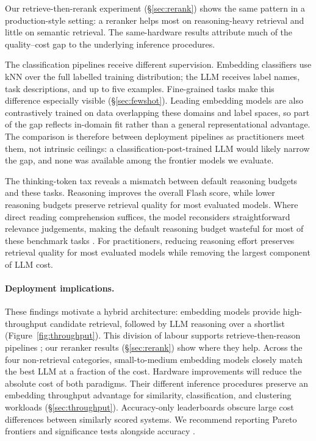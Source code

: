 Our retrieve-then-rerank experiment (\S\ref{sec:rerank}) shows the same pattern in a production-style setting: a reranker helps most on reasoning-heavy retrieval and little on semantic retrieval.
The same-hardware results attribute much of the quality--cost gap to the underlying inference procedures.

The classification pipelines receive different supervision. Embedding classifiers use kNN over the full labelled training distribution; the LLM receives label names, task descriptions, and up to five examples. Fine-grained tasks make this difference especially visible (\S\ref{sec:fewshot}).
Leading embedding models are also contrastively trained on data overlapping these domains and label spaces, so part of the gap reflects in-domain fit rather than a general representational advantage.
The comparison is therefore between deployment pipelines as practitioners meet them, not intrinsic ceilings: a classification-post-trained LLM would likely narrow the gap, and none was available among the frontier models we evaluate.

The thinking-token tax reveals a mismatch between default reasoning budgets and these tasks.
Reasoning improves the overall Flash score, while lower reasoning budgets preserve retrieval quality for most evaluated models.
Where direct reading comprehension suffices, the model reconsiders straightforward relevance judgements, making the default reasoning budget wasteful for most of these benchmark tasks \citep{lu2025cothurts}.
For practitioners, reducing reasoning effort preserves retrieval quality for most evaluated models while removing the largest component of LLM cost.

\paragraph{Deployment implications.}
These findings motivate a hybrid architecture: embedding models provide high-throughput candidate retrieval, followed by LLM reasoning over a shortlist (Figure~\ref{fig:throughput}).
This division of labour supports retrieve-then-reason pipelines \citep{lewis2020rag, gao2024retrievalaugmentedgenerationlargelanguage}; our reranker results (\S\ref{sec:rerank}) show where they help.
Across the four non-retrieval categories, small-to-medium embedding models closely match the best LLM at a fraction of the cost.
Hardware improvements will reduce the absolute cost of both paradigms. Their different inference procedures preserve an embedding throughput advantage for similarity, classification, and clustering workloads (\S\ref{sec:throughput}).
Accuracy-only leaderboards obscure large cost differences between similarly scored systems. We recommend reporting Pareto frontiers and significance tests alongside accuracy \citep{card2020reporting, dehghani2021benchmarklottery}.

